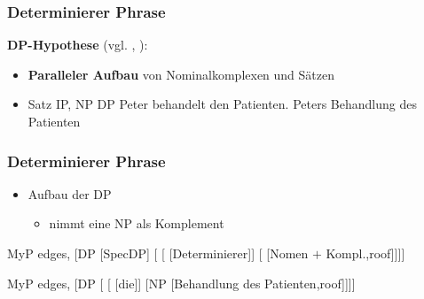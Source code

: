 
\begin{frame}
\frametitle{Determinierer Phrase}

\textbf{DP-Hypothese} (vgl. \citealt{Abney87x}, \citealt{Brame82a}):
		\begin{itemize}
			\item \textbf{Paralleler Aufbau} von Nominalkomplexen und Sätzen
			\item Satz \ras IP, NP \ras DP
			\eal
			\ex Peter behandelt den Patienten.
			\ex Peters Behandlung des Patienten
			\zl
			
		\end{itemize}

\end{frame}


\begin{frame}
\frametitle{Determinierer Phrase}

\begin{itemize}
	\item Aufbau der DP
	\begin{itemize}
		\item {} nimmt eine NP als Komplement
	\end{itemize}
\end{itemize}


\begin{minipage}[b]{0.48\textwidth}
	\centering
	\footnotesize{
		\begin{forest}
		MyP edges,
		[DP [SpecDP]
			[ 	[ [Determinierer]]
						[ [Nomen $+$ Kompl.,roof]]]]
		\end{forest}
		}
\end{minipage}  
%
%            
\begin{minipage}[b]{0.48\textwidth}
	\centering
	\footnotesize{
		\begin{forest}
		MyP edges,
		[DP [ 	[ [die]]
						[NP [Behandlung des Patienten,roof]]]]
		\end{forest}
		}
\end{minipage}  
 
\end{frame}


